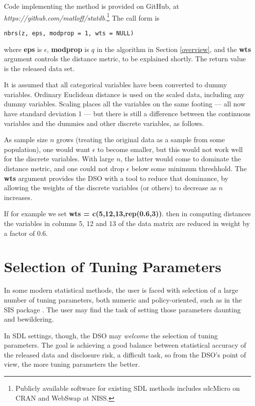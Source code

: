 \documentclass[11pt]{article}
\begin{document}
Code implementing the method is provided on GitHub, at {\it
https://github.com/matloff/statdb}.\footnote{Publicly available software 
for existing SDL methods includes sdcMicro on CRAN and WebSwap at NISS. }  
The call form is

\begin{lstlisting}
nbrs(z, eps, modprop = 1, wts = NULL) 
\end{lstlisting}

where {\bf eps} is $\epsilon$, {\bf modprop} is $q$ in the algorithm
in Section \ref{overview}, and the {\bf wts} argument controls the
distance metric, to be explained shortly.  The return value is the
released data set.

It is assumed that all categorical variables have been converted to
dummy variables.  Ordinary Euclidean distance is used on the scaled
data, including any dummy variables.  Scaling places all the variables
on the same footing --- all now have standard deviation 1 --- but there
is still a difference between the continuous variables and the dummies
and other discrete variables, as follows.

As sample size $n$ grows (treating the original data as a sample from
some population), one would want $\epsilon$ to become smaller, but this
would not work well for the discrete variables.  With large $n$, the
latter would come to dominate the distance metric, and one could not
drop $\epsilon$ below some minimum threshhold.  The {\bf wts}
argument provides the DSO with a tool to reduce that dominance, by
allowing the weights of the discrete variables (or others) to decrease
as $n$ increases.

If for example we set {\bf wts = c(5,12,13,rep(0.6,3))}. then in
computing distances the variables in columns 5, 12 and 13 of the data
matrix are reduced in weight by a factor of 0.6.  

\section{Selection of Tuning Parameters}

In some modern statistical methods, the user is faced with selection of
a large number of tuning parameters, both numeric and policy-oriented,
such as in the SIS package \cite{fan}.  The user may find the task of
setting those parameters daunting and bewildering.

In SDL settings, though, the DSO may {\it welcome} the selection of
tuning parameters. The goal is achieving a good balance between
statistical accuracy of the released data and disclosure risk, a
difficult task, so from the DSO's point of view, the more tuning
parameters the better.
\end{document}

